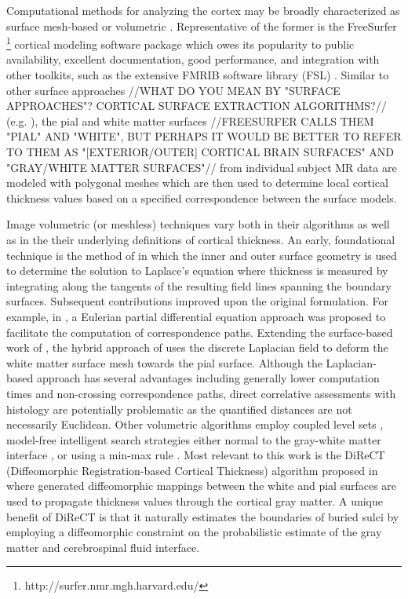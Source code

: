Computational methods for analyzing the cortex may be 
broadly characterized as surface mesh-based or volumetric \citep{scott2009,clarkson2011}.  Representative of the former is the
FreeSurfer%
\footnote{
http://surfer.nmr.mgh.harvard.edu/
}
cortical modeling software package \citep{dale1999,fischl1999,fischl2000,fischl2002,fischl2004}
which owes its popularity to public availability, excellent documentation, 
good performance, and  integration with other toolkits, such as the extensive FMRIB software 
library (FSL) \citep{smith2004}.  Similar to other surface
approaches //WHAT DO YOU MEAN BY "SURFACE APPROACHES"? CORTICAL SURFACE EXTRACTION ALGORITHMS?// (e.g. \cite{davatzikos1996,magnotta1999,macdonald2000,kim2005}), the pial
and white matter surfaces //FREESURFER CALLS THEM "PIAL" AND "WHITE", BUT PERHAPS IT WOULD BE BETTER
 TO REFER TO THEM AS "[EXTERIOR/OUTER] CORTICAL BRAIN SURFACES" AND "GRAY/WHITE MATTER SURFACES"// from individual subject MR data are modeled with polygonal meshes
which are then used to determine local cortical thickness values based on a specified correspondence between 
the surface models.

Image volumetric (or meshless) techniques vary both in their algorithms as well as
in the their underlying definitions of cortical thickness.  An early, foundational technique is the
method of \cite{jones2000} in which the inner and outer surface geometry is used to determine the
solution to Laplace's equation where thickness is measured by integrating along the 
tangents of the resulting field lines spanning the boundary surfaces.  Subsequent contributions
improved upon the original formulation.  For example, in \cite{yezzi2003}, a Eulerian partial differential equation approach
was proposed to facilitate the computation of correspondence paths.  Extending the surface-based
work of \cite{macdonald2000}, the hybrid approach of
\cite{kim2005} uses the discrete Laplacian field to deform the white matter surface mesh towards the 
pial surface.    Although the Laplacian-based approach has several advantages
including generally lower computation times and
non-crossing correspondence paths, direct correlative assessments with histology
are potentially problematic as the quantified distances 
are not necessarily Euclidean.  Other volumetric algorithms employ coupled
level sets \citep{zeng1999}, model-free intelligent search strategies either normal to 
the gray-white matter interface \citep{scott2009}, or using a min-max rule \citep{clement-vachet2011}.
Most relevant to this work is the DiReCT (Diffeomorphic Registration-based 
Cortical Thickness) algorithm proposed in \cite{das2009} where generated
diffeomorphic mappings between the 
white and pial surfaces are used to propagate thickness values
through the cortical gray matter.  A unique benefit of DiReCT is that it
naturally estimates the boundaries of buried sulci by employing a
diffeomorphic constraint on the probabilistic estimate of the gray
matter and cerebrospinal fluid interface.  

